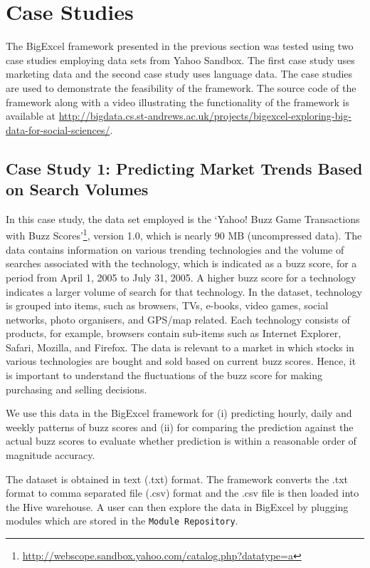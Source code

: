 \documentclass[10pt, conference, compsocconf]{IEEEtran}
\begin{document}
\section{Case Studies}
\label{casestudies}

The BigExcel framework presented in the previous section was tested using two case studies employing data sets from Yahoo Sandbox. The first case study uses marketing data and the second case study uses language data. The case studies are used to demonstrate the feasibility of the framework. The source code of the framework along with a video illustrating the functionality of the framework is available at \url{http://bigdata.cs.st-andrews.ac.uk/projects/bigexcel-exploring-big-data-for-social-sciences/}.

\subsection{Case Study 1: Predicting Market Trends Based on Search Volumes}
In this case study, the data set employed is the `Yahoo! Buzz Game Transactions with Buzz Scores'\footnote{\url{http://webscope.sandbox.yahoo.com/catalog.php?datatype=a}}, version 1.0, which is nearly 90 MB (uncompressed data). The data contains information on various trending technologies and the volume of searches associated with the technology, which is indicated as a buzz score, for a period from April 1, 2005 to July 31, 2005. A higher buzz score for a technology indicates a larger volume of search for that technology. In the dataset, technology is grouped into items, such as browsers, TVs, e-books, video games, social networks, photo organisers, and GPS/map related. Each technology consists of products, for example, browsers contain sub-items such as Internet Explorer, Safari, Mozilla, and Firefox. The data is relevant to a market in which stocks in various technologies are bought and sold based on current buzz scores. Hence, it is important to understand the fluctuations of the buzz score for making purchasing and selling decisions. 

We use this data in the BigExcel framework for (i) predicting hourly, daily and weekly patterns of buzz scores and (ii) for comparing the prediction against the actual buzz scores to evaluate whether prediction is within a reasonable order of magnitude accuracy. 

The dataset is obtained in text (.txt) format. The framework converts the .txt format to comma separated file (.csv) format and the .csv file is then loaded into the Hive warehouse. A user can then explore the data in BigExcel by plugging modules which are stored in the \texttt{Module Repository}.    
\end{document}
